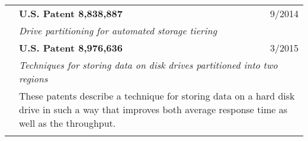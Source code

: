 \documentclass[10pt]{article}
\begin{document}
\begin{longtable}{p{ 90pt}p{299pt}r}
\\
\newpage
                    & {\bf U.S. Patent 8,838,887} & 9/2014 \\
                    & \multicolumn{2}{p{4.5in}}{\em Drive partitioning for automated storage tiering} \\
                    & {\bf U.S. Patent 8,976,636} & 3/2015 \\
                    & \multicolumn{2}{p{4.5in}}{\em Techniques for storing data on disk drives partitioned into two regions} \\
                    & \multicolumn{2}{p{4.5in}}{These patents describe a technique for storing data on a hard disk drive in such a way that
		    improves both average response time as well as the throughput.} \\
\\


\end{longtable}
\end{document}
